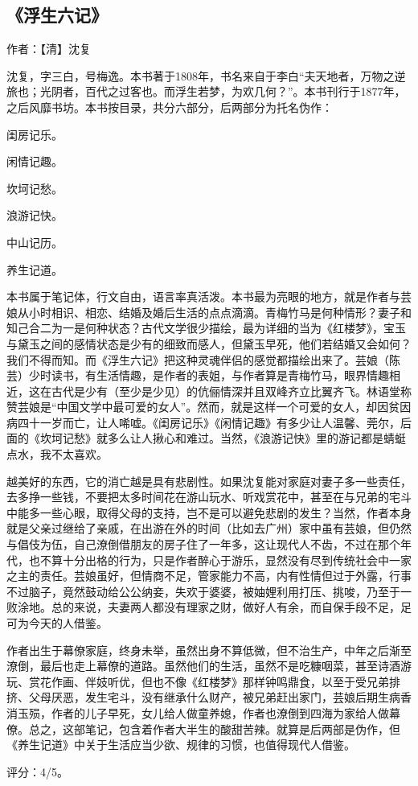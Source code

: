 \subsection{《浮生六记》}

作者：【清】沈复

沈复，字三白，号梅逸。本书著于1808年，书名来自于李白“夫天地者，万物之逆旅也；光阴者，百代之过客也。而浮生若梦，为欢几何？”。本书刊行于1877年，之后风靡书坊。本书按目录，共分六部分，后两部分为托名伪作：
\begin{itemize*}
    \item 闺房记乐。
    \item 闲情记趣。
    \item 坎坷记愁。
    \item 浪游记快。
    \item 中山记历。
    \item 养生记道。
\end{itemize*}

本书属于笔记体，行文自由，语言率真活泼。本书最为亮眼的地方，就是作者与芸娘从小时相识、相恋、结婚及婚后生活的点点滴滴。青梅竹马是何种情形？妻子和知己合二为一是何种状态？古代文学很少描绘，最为详细的当为《红楼梦》，宝玉与黛玉之间的感情状态是少有的细致而感人，但黛玉早死，他们若结婚又会如何？我们不得而知。而《浮生六记》把这种灵魂伴侣的感觉都描绘出来了。芸娘（陈芸）少时读书，有生活情趣，是作者的表姐，与作者算是青梅竹马，眼界情趣相近，这在古代是少有（至少是少见）的伉俪情深并且双峰齐立比翼齐飞。林语堂称赞芸娘是“中国文学中最可爱的女人”。然而，就是这样一个可爱的女人，却因贫因病四十一岁而亡，让人唏嘘。《闺房记乐》《闲情记趣》有多少让人温馨、莞尔，后面的《坎坷记愁》就多么让人揪心和难过。当然，《浪游记快》里的游记都是蜻蜓点水，我不太喜欢。

越美好的东西，它的消亡越是具有悲剧性。如果沈复能对家庭对妻子多一些责任，去多挣一些钱，不要把太多时间花在游山玩水、听戏赏花中，甚至在与兄弟的宅斗中能多一些心眼，取得父母的支持，岂不是可以避免悲剧的发生？当然，作者本身就是父亲过继给了亲戚，在出游在外的时间（比如去广州）家中虽有芸娘，但仍然与倡伎为伍，自己潦倒借朋友的房子住了一年多，这让现代人不齿，不过在那个年代，也不算十分出格的行为，只是作者醉心于游乐，显然没有尽到传统社会中一家之主的责任。芸娘虽好，但情商不足，管家能力不高，内有性情但过于外露，行事不过脑子，竟然鼓动给公公纳妾，失欢于婆婆，被妯娌利用打压、挑唆，乃至于一败涂地。总的来说，夫妻两人都没有理家之财，做好人有余，而自保手段不足，足可为今天的人借鉴。

作者出生于幕僚家庭，终身未举，虽然出身不算低微，但不治生产，中年之后渐至潦倒，最后也走上幕僚的道路。虽然他们的生活，虽然不是吃糠咽菜，甚至诗酒游玩、赏花作画、伴妓听优，但也不像《红楼梦》那样钟鸣鼎食，以至于受兄弟排挤、父母厌恶，发生宅斗，没有继承什么财产，被兄弟赶出家门，芸娘后期生病香消玉殒，作者的儿子早死，女儿给人做童养媳，作者也潦倒到四海为家给人做幕僚。总之，这部笔记，包含着作者大半生的酸甜苦辣。就算是后两部是伪作，但《养生记道》中关于生活应当少欲、规律的习惯，也值得现代人借鉴。

评分：4/5。